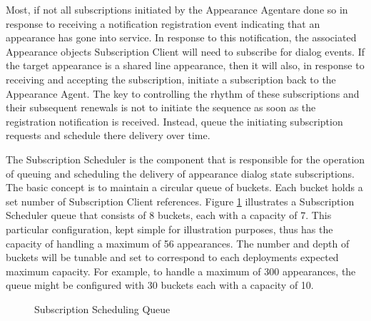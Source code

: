 \documentclass[twoside,11pt]{article}
\newcommand{\PAA}{Appearance Agent\space}
\begin{document}
Most, if not all subscriptions initiated by the \PAA are done so in response to receiving a
notification registration event indicating that an appearance has gone into service.  In response to
this notification, the associated Appearance objects Subscription Client will need to subscribe for
dialog events.  If the target appearance is a shared line appearance, then it will also, in response
to receiving and accepting the subscription, initiate a subscription back to the \PAA.  The key to
controlling the rhythm of these subscriptions and their subsequent renewals is not to initiate the
sequence as soon as the registration notification is received.  Instead, queue the initiating
subscription requests and schedule there delivery over time.

The Subscription Scheduler is the component that is responsible for the operation of queuing and
scheduling the delivery of appearance dialog state subscriptions.  The basic concept is to maintain
a circular queue of buckets. Each bucket holds a set number of Subscription Client references. 
Figure \ref{ScheduleQueue} illustrates a Subscription Scheduler queue that consists of 8 buckets,
each with a capacity of 7.  This particular configuration, kept simple for illustration purposes,
thus has the capacity of handling a maximum of 56 appearances.  The number and depth of buckets will
be tunable and set to correspond to each deployments expected maximum capacity.  For example, to
handle a maximum of 300 appearances, the queue might be configured with 30 buckets each with a
capacity of 10.

\begin{figure}[ht] \centering
{}
\caption{Subscription Scheduling Queue}
\label{ScheduleQueue}
\end{figure}
\end{document}
